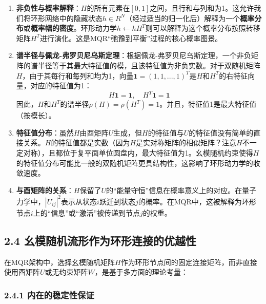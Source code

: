 \documentclass[
  12pt,
]{article}
\begin{document}
\begin{enumerate}
\def\labelenumi{\arabic{enumi}.}
\item
  \textbf{非负性与概率解释}：\(H\)的所有元素在\([0, 1]\)之间，且行和与列和为1。这允许我们将环形网络中的隐藏状态\(h \in R^N\)（经过适当的归一化后）解释为一个\textbf{概率分布}或\textbf{概率幅的密度}。环形动力学\(h \leftarrow h H^T\)则可以解释为这个概率分布按照转移矩阵\(H^T\)进行演化。这是MQR``弛豫到平衡''过程的核心概率图景。
\item
  \textbf{谱半径与佩龙-弗罗贝尼乌斯定理}：根据佩龙-弗罗贝尼乌斯定理，一个非负矩阵的谱半径等于其最大特征值的模，且该特征值为非负实数。对于双随机矩阵\(H\)，由于其每行和每列和均为1，向量\(\textbf{1} = (1,1,...,1)^T\)是\(H\)和\(H^T\)的右特征向量，对应的特征值为1：
  \[H \textbf{1} = \textbf{1}, \quad H^T \textbf{1} = \textbf{1}\]
  因此，\(H\)和\(H^T\)的谱半径\(\rho(H) = \rho(H^T) = 1\)。并且，特征值1是最大特征值（按模长）。
\item
  \textbf{特征值分布}：虽然\(H\)由酉矩阵\(U\)生成，但\(H\)的特征值与\(U\)的特征值没有简单的直接关系。\(H\)的特征值都是实数（因为\(H\)是实对称矩阵的相似矩阵？注意\(H\)不一定对称），且都位于复平面单位圆盘内，最大特征值为1。幺模随机约束使得\(H\)的特征值分布可能比一般的双随机矩阵更具结构性，这影响了环形动力学的收敛速度。
\item
  \textbf{与酉矩阵的关系}：\(H\)保留了\(U\)的``能量守恒''信息在概率意义上的对应。在量子力学中，\(|U_{ij}|^2\)表示从状态\(i\)跃迁到状态\(j\)的概率。在MQR中，这被解释为环形节点\(i\)上的``信息''或``激活''被传递到节点\(j\)的权重。
\end{enumerate}

\hypertarget{ux5e7aux6a21ux968fux673aux6d41ux5f62ux4f5cux4e3aux73afux5f62ux8fdeux63a5ux7684ux4f18ux8d8aux6027}{%
\subsection{2.4
幺模随机流形作为环形连接的优越性}\label{ux5e7aux6a21ux968fux673aux6d41ux5f62ux4f5cux4e3aux73afux5f62ux8fdeux63a5ux7684ux4f18ux8d8aux6027}}

在MQR架构中，选择幺模随机矩阵\(H\)作为环形节点间的固定连接矩阵，而非直接使用酉矩阵\(U\)或无约束矩阵\(W\)，是基于多方面的理论考量：

\hypertarget{ux5185ux5728ux7684ux7a33ux5b9aux6027ux4fddux8bc1}{%
\subsubsection{2.4.1
内在的稳定性保证}\label{ux5185ux5728ux7684ux7a33ux5b9aux6027ux4fddux8bc1}}
\end{document}
